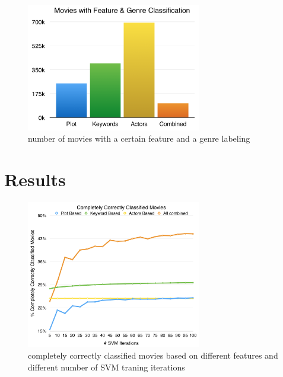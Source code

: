 \documentclass{vldb}
\begin{document}
\begin{figure}
\begin{center}
\includegraphics[width=3.00in]{FeaturesAndGenresBarChart.png}
\caption{number of movies with a certain feature and a genre labeling}
\label{fig:FeaturesAndGenresBarChart}
\end{center}
\end{figure}


\section{Results}

\begin{figure}
\begin{center}
\includegraphics[width=3.00in]{CCCM.png}
\caption{completely correctly classified movies based on different features and different number of SVM traning iterations}
\label{fig:CCCM}
\end{center}
\end{figure}
\end{document}
